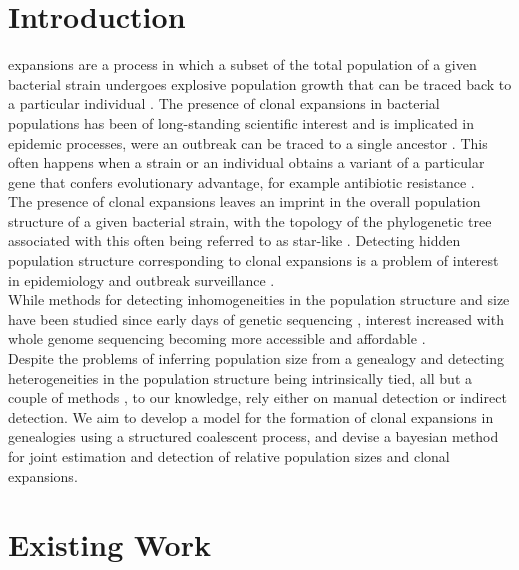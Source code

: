 \documentclass{ieeeaccess}
\theoremstyle{definition}
\begin{document}
\section{Introduction}
 expansions are a process in which a subset of the total population of a given bacterial strain undergoes explosive population growth that can be traced back to a particular individual \cite{smith_how_1993}. The presence of clonal expansions in bacterial populations has been of long-standing scientific interest and is implicated in epidemic processes, were an outbreak can be traced to a single ancestor \cite{smith_how_1993,spratt_displaying_2004,fraser_neutral_2005,ledda_re-emergence_2017}. This often happens when a  strain or an individual obtains a variant of a particular gene that confers evolutionary advantage, for example antibiotic resistance \cite{holden_genomic_2013,hsu_evolutionary_2015, ledda_re-emergence_2017}.\\
The presence of clonal expansions leaves an imprint in the overall population structure of a given bacterial strain, with the topology of the phylogenetic tree associated with this often being referred to as star-like \cite{smith_how_1993,spratt_displaying_2004}.
Detecting hidden population structure corresponding to clonal expansions is a problem of interest in epidemiology and outbreak surveillance \cite{volz_identification_nodate}.\\
While methods for detecting inhomogeneities in the population structure and size have been studied since early days of genetic sequencing \cite{smith_how_1993,spratt_displaying_2004}, interest increased with whole genome sequencing becoming more accessible and affordable \cite{holden_genomic_2013,dearlove_measuring_2015,eldholm_four_2015}.\\
Despite the problems of inferring population size from a genealogy and detecting heterogeneities in the population structure being intrinsically tied, all but a couple of methods \cite{volz_identification_nodate,barido-sottani_multitype_2020}, to our knowledge, rely either on manual detection or indirect detection. We aim to develop a model for the formation of clonal expansions in genealogies using a structured coalescent process, and devise a bayesian method for joint estimation and detection of relative population sizes and clonal expansions.
\section{Existing Work}
\end{document}
